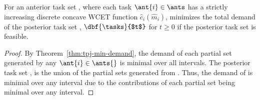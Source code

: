 \begin{theorem}
  \begin{corollary}
    \label{corollary:tpj-min-demand-all-tasks}
    For an anterior task set \ants{}, where each task ${\ant{i} \in \ants}$
    has a strictly increasing discrete concave WCET function
    ${\hat{c}_i(\hat{m}_i)}$, \tpj{} minimizes the total demand of the
    posterior task set \tasks{}, ${\dbf{\tasks}{$t$}}$ for ${t \ge 0}$
    if the posterior task set is feasible.

    \begin{proof}
      By Theorem~\ref{thm:tpj-min-demand}, the demand of each partial
      set generated by any ${\ant{i} \in \ants{}}$ is minimal over all
      intervals. The posterior task set \tasks{}, is the union of the
      partial sets generated from \ants{}. Thus, the demand of
      \tasks{} is minimal over any interval due to the contributions
      of each partial set being minimal over any interval.
    \end{proof}
    
  \end{corollary}
\end{theorem}
